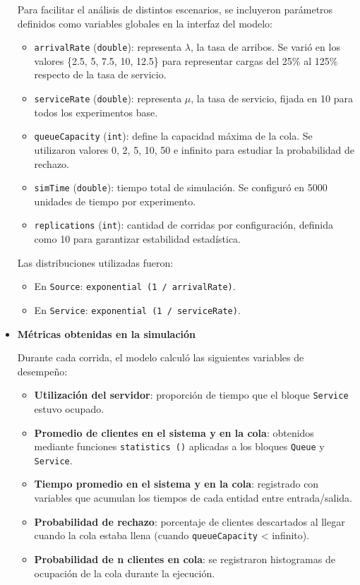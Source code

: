 \documentclass[12pt]{article}
\begin{document}
\begin{itemize}
    Para facilitar el análisis de distintos escenarios, se incluyeron parámetros definidos como variables globales en la interfaz del modelo:

    \begin{itemize}
        \item \texttt{arrivalRate} (\texttt{double}): representa $\lambda$, la tasa de arribos. Se varió en los valores \{2.5, 5, 7.5, 10, 12.5\} para representar cargas del 25\% al 125\% respecto de la tasa de servicio.
        \item \texttt{serviceRate} (\texttt{double}): representa $\mu$, la tasa de servicio, fijada en 10 para todos los experimentos base.
        \item \texttt{queueCapacity} (\texttt{int}): define la capacidad máxima de la cola. Se utilizaron valores 0, 2, 5, 10, 50 e infinito para estudiar la probabilidad de rechazo.
        \item \texttt{simTime} (\texttt{double}): tiempo total de simulación. Se configuró en 5000 unidades de tiempo por experimento.
        \item \texttt{replications} (\texttt{int}): cantidad de corridas por configuración, definida como 10 para garantizar estabilidad estadística.
    \end{itemize}

    Las distribuciones utilizadas fueron:

    \begin{itemize}
        \item En \texttt{Source}: \texttt{exponential (1 / arrivalRate)}.
        \item En \texttt{Service}: \texttt{exponential (1 / serviceRate)}.
    \end{itemize}

    \item \textbf{Métricas obtenidas en la simulación}

    Durante cada corrida, el modelo calculó las siguientes variables de desempeño:

    \begin{itemize}
        \item \textbf{Utilización del servidor}: proporción de tiempo que el bloque \texttt{Service} estuvo ocupado.
        \item \textbf{Promedio de clientes en el sistema y en la cola}: obtenidos mediante funciones \texttt{statistics ()} aplicadas a los bloques \texttt{Queue} y \texttt{Service}.
        \item \textbf{Tiempo promedio en el sistema y en la cola}: registrado con variables que acumulan los tiempos de cada entidad entre entrada/salida.
        \item \textbf{Probabilidad de rechazo}: porcentaje de clientes descartados al llegar cuando la cola estaba llena (cuando \texttt{queueCapacity} < infinito).
        \item \textbf{Probabilidad de n clientes en cola}: se registraron histogramas de ocupación de la cola durante la ejecución.
    \end{itemize}


\end{itemize}
\end{document}
